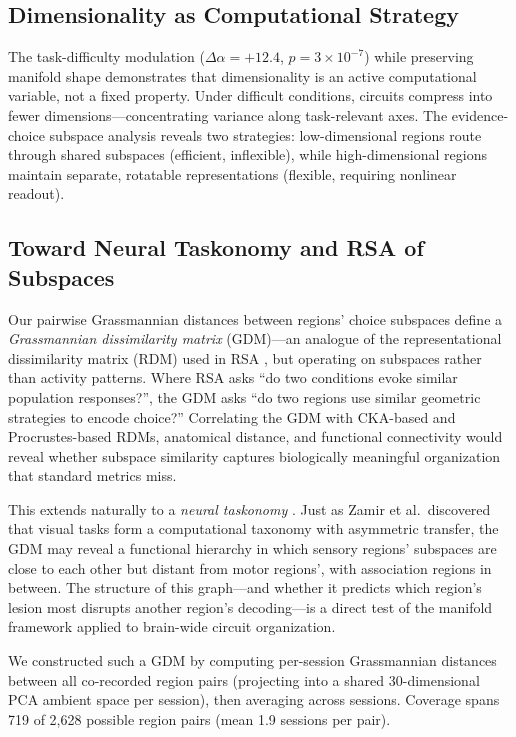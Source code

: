 \documentclass{article}
\begin{document}
\subsection{Dimensionality as Computational Strategy}

The task-difficulty modulation ($\Delta\alpha = +12.4$, $p = 3 \times 10^{-7}$) while preserving manifold shape demonstrates that dimensionality is an active computational variable, not a fixed property. Under difficult conditions, circuits compress into fewer dimensions---concentrating variance along task-relevant axes. The evidence-choice subspace analysis reveals two strategies: low-dimensional regions route through shared subspaces (efficient, inflexible), while high-dimensional regions maintain separate, rotatable representations (flexible, requiring nonlinear readout).

\subsection{Toward Neural Taskonomy and RSA of Subspaces}

Our pairwise Grassmannian distances between regions' choice subspaces define a \emph{Grassmannian dissimilarity matrix} (GDM)---an analogue of the representational dissimilarity matrix (RDM) used in RSA \citep{kriegeskorte2008representational}, but operating on subspaces rather than activity patterns. Where RSA asks ``do two conditions evoke similar population responses?'', the GDM asks ``do two regions use similar geometric strategies to encode choice?'' Correlating the GDM with CKA-based and Procrustes-based RDMs, anatomical distance, and functional connectivity would reveal whether subspace similarity captures biologically meaningful organization that standard metrics miss.

This extends naturally to a \emph{neural taskonomy} \citep{zamir2018taskonomy}. Just as Zamir et al.\ discovered that visual tasks form a computational taxonomy with asymmetric transfer, the GDM may reveal a functional hierarchy in which sensory regions' subspaces are close to each other but distant from motor regions', with association regions in between. The structure of this graph---and whether it predicts which region's lesion most disrupts another region's decoding---is a direct test of the manifold framework applied to brain-wide circuit organization.

We constructed such a GDM by computing per-session Grassmannian distances between all co-recorded region pairs (projecting into a shared 30-dimensional PCA ambient space per session), then averaging across sessions. Coverage spans 719 of 2,628 possible region pairs (mean 1.9 sessions per pair).
\end{document}
